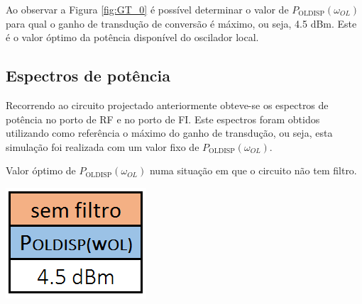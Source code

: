 \documentclass[11pt]{article}
\numberwithin{equation}{section}
\begin{document}
Ao observar a Figura \ref{fig:GT_0} é possível determinar o valor de $ P_{\text{OLDISP}}\left(\omega_{OL}\right) $ para qual o ganho de transdução de conversão é máximo, ou seja, 4.5 dBm. Este é o valor óptimo da potência disponível do oscilador local.       

\subsection{Espectros de potência} 

Recorrendo ao circuito projectado anteriormente obteve-se os espectros de potência no porto de RF e no porto de FI. Este espectros foram obtidos utilizando como referência o máximo do ganho de transdução, ou seja, esta simulação foi realizada com um valor fixo de $ P_{\text{OLDISP}}\left(\omega_{OL}\right) $.

\begin{table}[h]
	\centering
	\caption{Valor óptimo de $ P_{\text{OLDISP}}\left(\omega_{OL}\right) $ numa situação em que o circuito não tem filtro.}
	\vspace{-1.5mm}
	\includegraphics[keepaspectratio=true, scale=0.45]{teoricas/poldispSemFiltro}
\end{table}

\vspace{-7mm}
\end{document}
